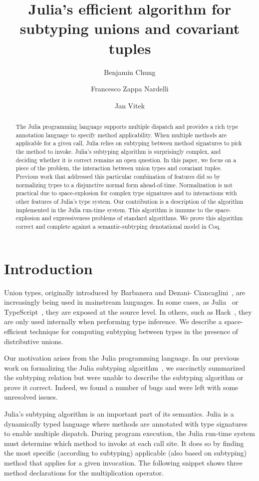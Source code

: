 \documentclass[a4paper,english]{lipics-v2019}
\title{Julia's efficient algorithm for subtyping unions and covariant tuples}
\author{Benjamin Chung}{Northeastern University}{}{}{}%
\author{Francesco Zappa Nardelli}{INRIA}{}{}{}
\author{Jan Vitek}{Northeastern University \& Czech Technical University}{}{}{}
\begin{document}
\maketitle
\begin{abstract}
  The Julia programming language supports multiple dispatch and provides a
  rich type annotation language to specify method applicability. When
  multiple methods are applicable for a given call, Julia relies on
  subtyping between method signatures to pick the method to invoke. Julia's
  subtyping algorithm is surprisingly complex, and deciding whether it is
  correct remains an open question. In this paper, we focus on a piece of
  the problem, the interaction between union types and covariant
  tuples. Previous work that addressed this particular combination of
  features did so by normalizing types to a disjunctive normal form
  ahead-of-time. Normalization is not practical due to space-explosion for
  complex type signatures and to interactions with other features of Julia's
  type system.  Our contribution is a description of the algorithm
  implemented in the Julia run-time system. This algorithm is immune to the
  space-explosion and expressiveness problems of standard algorithms.  We
  prove this algorithm correct and complete against a semantic-subtyping
  denotational model in Coq.
\end{abstract}

\section{Introduction}

Union types, originally introduced by Barbanera and Dezani-
Ciancaglini~\cite{barbanera1991intersection}, are increasingly being used in
mainstream languages. In some cases, as Julia~\cite{BezansonEKS17} or
TypeScript~\cite{typescript}, they are exposed at the source level. In others,
such as Hack~\cite{hack}, they are only used internally when performing type
inference. We describe a space-efficient technique for computing subtyping between 
types in the presence of distributive unions.

Our motivation arises from the Julia programming language. In our previous
work on formalizing the Julia subtyping algorithm~\cite{DBLP:NardelliBPCBV18},
we succinctly summarized the subtyping relation but were unable to describe
the subtyping algorithm or prove it correct. Indeed, we found a number of bugs
and were left with some unresolved issues.

Julia's subtyping algorithm is an important part of its semantics. Julia is a
dynamically typed language where methods are annotated with type signatures to
enable multiple dispatch. During program execution, the Julia run-time system
must determine which method to invoke at each call site. It does so by finding
the most specific (according to subtyping) applicable (also based on
subtyping) method that applies for a given invocation. The following snippet
shows three method declarations for the multiplication operator.
\end{document}
